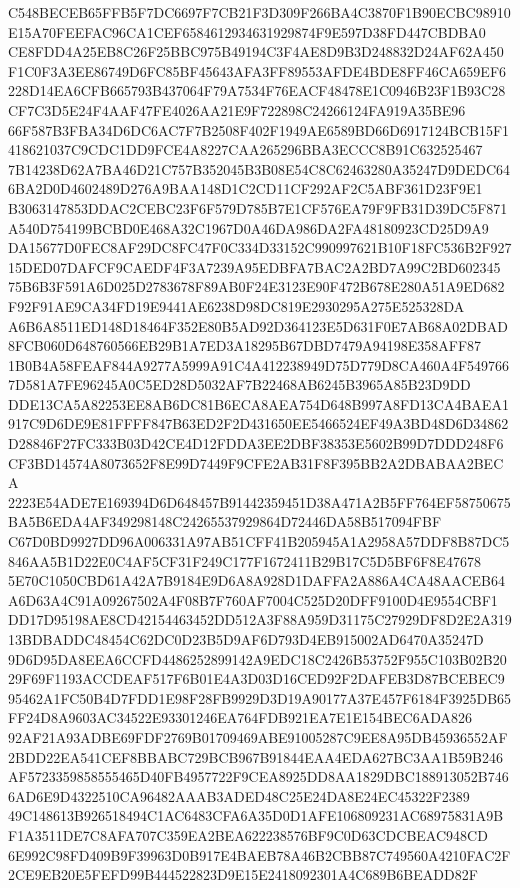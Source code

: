 \documentclass[UTF8,fontset=fandol,zihao=-4,a4paper]{ctexart}
\begin{document}
{{C548BECEB65FFB5F7DC6697F7CB21F3D309F266BA4C3870F1B90ECBC98910E15A70FEEFAC96CA1CEF6584612934631929874F9E597D38FD447CBDBA0
CE8FDD4A25EB8C26F25BBC975B49194C3F4AE8D9B3D248832D24AF62A450F1C0F3A3EE86749D6FC85BF45643AFA3FF89553AFDE4BDE8FF46CA659EF6
228D14EA6CFB665793B437064F79A7534F76EACF48478E1C0946B23F1B93C28CF7C3D5E24F4AAF47FE4026AA21E9F722898C24266124FA919A35BE96
66F587B3FBA34D6DC6AC7F7B2508F402F1949AE6589BD66D6917124BCB15F1418621037C9CDC1DD9FCE4A8227CAA265296BBA3ECCC8B91C632525467
7B14238D62A7BA46D21C757B352045B3B08E54C8C62463280A35247D9DEDC646BA2D0D4602489D276A9BAA148D1C2CD11CF292AF2C5ABF361D23F9E1
B3063147853DDAC2CEBC23F6F579D785B7E1CF576EA79F9FB31D39DC5F871A540D754199BCBD0E468A32C1967D0A46DA986DA2FA48180923CD25D9A9
DA15677D0FEC8AF29DC8FC47F0C334D33152C990997621B10F18FC536B2F92715DED07DAFCF9CAEDF4F3A7239A95EDBFA7BAC2A2BD7A99C2BD602345
75B6B3F591A6D025D2783678F89AB0F24E3123E90F472B678E280A51A9ED682F92F91AE9CA34FD19E9441AE6238D98DC819E2930295A275E525328DA
A6B6A8511ED148D18464F352E80B5AD92D364123E5D631F0E7AB68A02DBAD8FCB060D648760566EB29B1A7ED3A18295B67DBD7479A94198E358AFF87
1B0B4A58FEAF844A9277A5999A91C4A412238949D75D779D8CA460A4F5497667D581A7FE96245A0C5ED28D5032AF7B22468AB6245B3965A85B23D9DD
DDE13CA5A82253EE8AB6DC81B6ECA8AEA754D648B997A8FD13CA4BAEA1917C9D6DE9E81FFFF847B63ED2F2D431650EE5466524EF49A3BD48D6D34862
D28846F27FC333B03D42CE4D12FDDA3EE2DBF38353E5602B99D7DDD248F6CF3BD14574A8073652F8E99D7449F9CFE2AB31F8F395BB2A2DBABAA2BECA
2223E54ADE7E169394D6D648457B91442359451D38A471A2B5FF764EF58750675BA5B6EDA4AF349298148C24265537929864D72446DA58B517094FBF
C67D0BD9927DD96A006331A97AB51CFF41B205945A1A2958A57DDF8B87DC5846AA5B1D22E0C4AF5CF31F249C177F1672411B29B17C5D5BF6F8E47678
5E70C1050CBD61A42A7B9184E9D6A8A928D1DAFFA2A886A4CA48AACEB64A6D63A4C91A09267502A4F08B7F760AF7004C525D20DFF9100D4E9554CBF1
DD17D95198AE8CD42154463452DD512A3F88A959D31175C27929DF8D2E2A31913BDBADDC48454C62DC0D23B5D9AF6D793D4EB915002AD6470A35247D
9D6D95DA8EEA6CCFD4486252899142A9EDC18C2426B53752F955C103B02B2029F69F1193ACCDEAF517F6B01E4A3D03D16CED92F2DAFEB3D87BCEBEC9
95462A1FC50B4D7FDD1E98F28FB9929D3D19A90177A37E457F6184F3925DB65FF24D8A9603AC34522E93301246EA764FDB921EA7E1E154BEC6ADA826
92AF21A93ADBE69FDF2769B01709469ABE91005287C9EE8A95DB45936552AF2BDD22EA541CEF8BBABC729BCB967B91844EAA4EDA627BC3AA1B59B246
AF5723359858555465D40FB4957722F9CEA8925DD8AA1829DBC188913052B7466AD6E9D4322510CA96482AAAB3ADED48C25E24DA8E24EC45322F2389
49C148613B926518494C1AC6483CFA6A35D0D1AFE106809231AC68975831A9BF1A3511DE7C8AFA707C359EA2BEA622238576BF9C0D63CDCBEAC948CD
6E992C98FD409B9F39963D0B917E4BAEB78A46B2CBB87C749560A4210FAC2F2CE9EB20E5FEFD99B444522823D9E15E2418092301A4C689B6BEADD82F
}}
\end{document}
